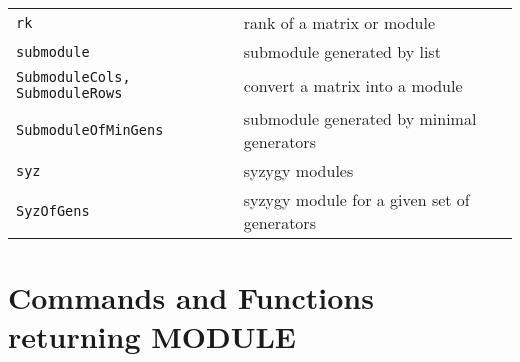 \documentclass[a4paper]{mybook}
\begin{document}
\begin{center}
\begin{longtable}{ll}
{\verb~rk~} &
      rank of a matrix or module\\
   
{\verb~submodule~} &
      submodule generated by list\\
   
{\verb~SubmoduleCols, SubmoduleRows~} &
      convert a matrix into a module\\
   
{\verb~SubmoduleOfMinGens~} &
      submodule generated by minimal generators\\
   
{\verb~syz~} &
      syzygy modules\\
   
{\verb~SyzOfGens~} &
      syzygy module for a given set of generators\\
   
\end{longtable}
\end{center}

\noindent



\section{Commands and Functions returning MODULE}
\label{Commands and Functions returning MODULE}

        
\end{document}
